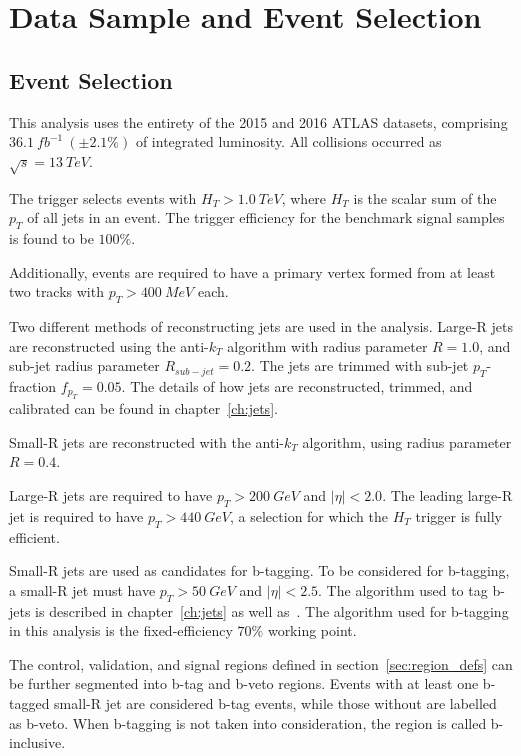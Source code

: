 \chapter{Data Sample and Event Selection}\label{ch:data_and_event_selection}

\section{Event Selection} \label{sec:event_selection}
This analysis uses the entirety of the 2015 and 2016 ATLAS datasets, comprising \linebreak
$36.1~fb^{-1}~(\pm2.1\%)$ of integrated luminosity.
All collisions occurred as $\sqrt{s}=13~TeV$.

The trigger selects events with $H_{T}>1.0~TeV$, where $H_{T}$ is the scalar sum of the $p_{T}$ of all jets in an event.
The trigger efficiency for the benchmark signal samples is found to be $100\%$.

Additionally, events are required to have a primary vertex formed from at least two tracks with $p_{T}>400~MeV$ each.

Two different methods of reconstructing jets are used in the analysis.
Large-R jets are reconstructed using the anti-$k_{T}$ algorithm with radius parameter $R=1.0$,
and sub-jet radius parameter $R_{sub-jet}=0.2$.
The jets are trimmed with sub-jet $p_{T}$-fraction $f_{p_{T}}=0.05$.
The details of how jets are reconstructed, trimmed, and calibrated can be found in chapter~\ref{ch:jets}.

Small-R jets are reconstructed with the anti-$k_{T}$ algorithm, using radius parameter $R=0.4$.

Large-R jets are required to have $p_{T}>200~GeV$ and $|\eta|<2.0$.
The leading large-R jet is required to have $p_{T}>440~GeV$, a selection for which the $H_{T}$ trigger is fully efficient.

Small-R jets are used as candidates for b-tagging.
To be considered for b-tagging, a small-R jet must have $p_{T}>50~GeV$ and $|\eta|<2.5$.
The algorithm used to tag b-jets is described in chapter~\ref{ch:jets} as well as~\cite{b-jet-perf-1,b-jet-perf-2}.
The algorithm used for b-tagging in this analysis is the fixed-efficiency $70\%$ working point.

The control, validation, and signal regions defined in section~\ref{sec:region_defs} can be further segmented into b-tag and b-veto regions.
Events with at least one b-tagged small-R jet are considered b-tag events, while those without are labelled as b-veto.
When b-tagging is not taken into consideration, the region is called b-inclusive.

